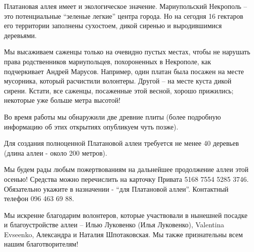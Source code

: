 Платановая аллея имеет и экологическое значение. Мариупольский Некрополь – это
потенциальные \enquote{зеленые легкие} центра города. Но на сегодня 16 гектаров
его территории заполнены сухостоем, дикой сиренью и выродившимися деревьями.

Мы высаживаем саженцы только на очевидно пустых местах, чтобы не нарушать права
родственников мариупольцев, похороненных в Некрополе, как подчеркивает Андрей
Марусов. Например, один платан была посажен на месте мусорника, который
расчистили волонтеры. Другой – на месте куста дикой сирени. Кстати, все
саженцы, посаженные этой весной, хорошо прижились; некоторые уже больше метра
высотой!

Во время работы мы обнаружили две древние плиты (более подробную информацию об
этих открытиях опубликуем чуть позже).

Для создания полноценной Платановой аллеи требуется не менее 40 деревьев (длина
аллеи - около 200 метров).

Мы будем рады любым пожертвованиям на дальнейшее продолжение аллеи этой осенью!
Средства можно перечислить на карточку Привата 5168 7554 5285 3746. Обязательно
укажите в назначении - \enquote{для Платановой аллеи}. Контактный телефон 096 463 69
88.

Мы искренне благодарим волонтеров, которые участвовали в нынешней посадке и
благоустройстве аллеи – Илью Луковенко (Илья Луковенко), Valentina Evseenko,
Александра и Наталия Шпотаковская. Мы также признательны всем нашим
благотворителям!
